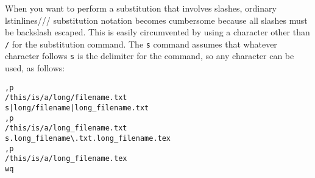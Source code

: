 \documentclass[12pt]{article}
\begin{document}
When you want to perform a substitution that involves slashes, ordinary lstinline{s///} substitution notation
becomes cumbersome because all slashes must be backslash escaped.
This is easily circumvented by using a character other than \lstinline{/} for the substitution command.
The \lstinline{s} command assumes that whatever character follows \lstinline{s} is the delimiter
for the command, so any character can be used, as follows:

\begin{lstlisting}
,p
/this/is/a/long/filename.txt
s|long/filename|long_filename.txt
,p
/this/is/a/long_filename.txt
s.long_filename\.txt.long_filename.tex
,p
/this/is/a/long_filename.tex
wq
\end{lstlisting}






\end{document}
